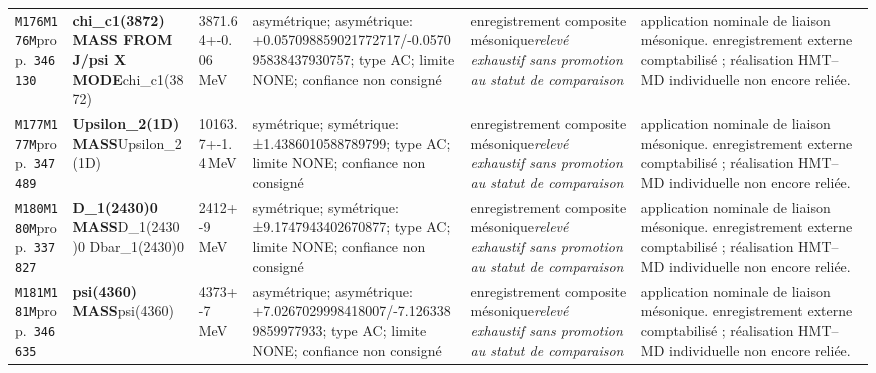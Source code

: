 \begin{landscape}
\begin{longtable}{L{1.85cm}L{4.45cm}L{2.35cm}L{4.05cm}L{3.35cm}L{7.15cm}}
\texttt{M176}\newline \texttt{M176M}\newline prop.\ \texttt{346130} & \textbf{chi\_\allowbreak{}c1(3872) MASS FROM J/psi X MODE}\newline chi\_\allowbreak{}c1(3872) & 3871.64+-0.06\,MeV & asymétrique; asymétrique: +0.057098859021772717/-0.057095838437930757; type AC; limite NONE; confiance non consigné & enregistrement composite mésonique\newline \emph{relevé exhaustif sans promotion au statut de comparaison} & application nominale de liaison mésonique. enregistrement externe comptabilisé ; réalisation HMT--MD individuelle non encore reliée. \\
\texttt{M177}\newline \texttt{M177M}\newline prop.\ \texttt{347489} & \textbf{Upsilon\_\allowbreak{}2(1D) MASS}\newline Upsilon\_\allowbreak{}2(1D) & 10163.7+-1.4\,MeV & symétrique; symétrique: ±1.4386010588789799; type AC; limite NONE; confiance non consigné & enregistrement composite mésonique\newline \emph{relevé exhaustif sans promotion au statut de comparaison} & application nominale de liaison mésonique. enregistrement externe comptabilisé ; réalisation HMT--MD individuelle non encore reliée. \\
\texttt{M180}\newline \texttt{M180M}\newline prop.\ \texttt{337827} & \textbf{D\_\allowbreak{}1(2430)0 MASS}\newline D\_\allowbreak{}1(2430)0 \textbar{}\allowbreak{} Dbar\_\allowbreak{}1(2430)0 & 2412+-9\,MeV & symétrique; symétrique: ±9.1747943402670877; type AC; limite NONE; confiance non consigné & enregistrement composite mésonique\newline \emph{relevé exhaustif sans promotion au statut de comparaison} & application nominale de liaison mésonique. enregistrement externe comptabilisé ; réalisation HMT--MD individuelle non encore reliée. \\
\texttt{M181}\newline \texttt{M181M}\newline prop.\ \texttt{346635} & \textbf{psi(4360) MASS}\newline psi(4360) & 4373+-7\,MeV & asymétrique; asymétrique: +7.0267029998418007/-7.1263389859977933; type AC; limite NONE; confiance non consigné & enregistrement composite mésonique\newline \emph{relevé exhaustif sans promotion au statut de comparaison} & application nominale de liaison mésonique. enregistrement externe comptabilisé ; réalisation HMT--MD individuelle non encore reliée. \\

\end{longtable}
\end{landscape}
